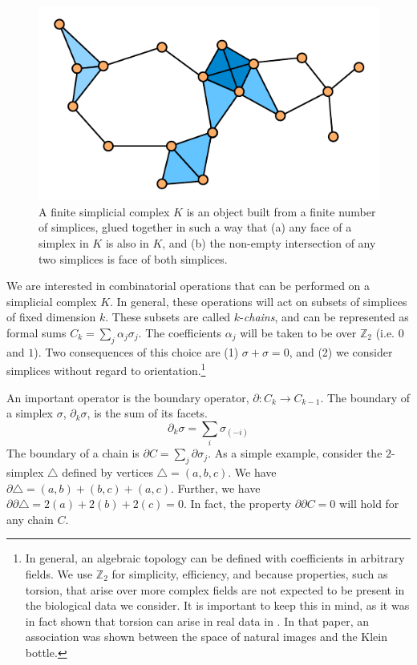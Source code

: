 \begin{figure}
\centering
\includegraphics[]{./fig/background/simplicial_complex.pdf}
\caption[Simplicial Complex: A discrete topological space]{A finite simplicial complex $K$ is an object built from a finite number of simplices, glued together in such a way that (a) any face of a simplex in $K$ is also in $K$, and (b) the non-empty intersection of any two simplices is face of both simplices.}
\label{fig:bg:simplicial_complex}
\end{figure}

We are interested in combinatorial operations that can be performed on a simplicial complex $K$.
In general, these operations will act on subsets of simplices of fixed dimension $k$.
These subsets are called $k$-\emph{chains}, and can be represented as formal sums $C_{k}=\sum_{j}\alpha_{j}\sigma_{j}$.
The coefficients $\alpha_j$ will be taken to be over $\mathbb{Z}_2$ (i.e. $0$ and $1$).
Two consequences of this choice are (1) $\sigma+\sigma=0$, and (2) we consider simplices without regard to orientation.\footnote{In general, an algebraic topology can be defined with coefficients in arbitrary fields. We use $\mathbb{Z}_2$ for simplicity, efficiency, and because properties, such as torsion, that arise over more complex fields are not expected to be present in the biological data we consider. It is important to keep this in mind, as it was in fact shown that torsion can arise in real data in \cite{Carlsson:2008up}. In that paper, an association was shown between the space of natural images and the Klein bottle.}

An important operator is the boundary operator, $\partial:C_{k}\rightarrow{C_{k-1}}$.
The boundary of a simplex $\sigma$, $\partial_{k}\sigma$, is the sum of its facets.
\begin{equation}
\partial_{k}\sigma = \sum_{i}{\sigma_{(-i)}}
\end{equation}
The boundary of a chain is $\partial C = \sum_{j}\partial\sigma_{j}$.
As a simple example, consider the $2$-simplex $\triangle$ defined by vertices $\triangle=(a,b,c)$.
We have $\partial\triangle = (a,b) + (b,c) + (a,c)$.
Further, we have $\partial\partial\triangle = 2(a) + 2(b) + 2(c) = 0$.
In fact, the property $\partial\partial C = 0$ will hold for any chain $C$.

